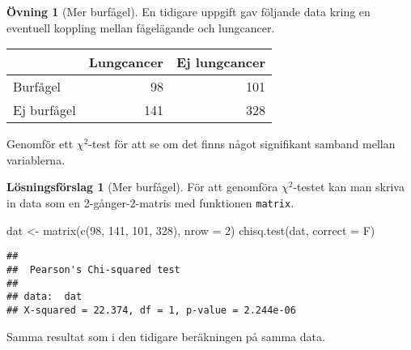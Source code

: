 \documentclass[
]{book}
\newenvironment{Shaded}{\begin{snugshade}}{\end{snugshade}}
\newcommand{\AttributeTok}[1]{\textcolor[rgb]{0.77,0.63,0.00}{#1}}
\newcommand{\DecValTok}[1]{\textcolor[rgb]{0.00,0.00,0.81}{#1}}
\newcommand{\FunctionTok}[1]{\textcolor[rgb]{0.00,0.00,0.00}{#1}}
\newcommand{\NormalTok}[1]{#1}
\newcommand{\OtherTok}[1]{\textcolor[rgb]{0.56,0.35,0.01}{#1}}
\theoremstyle{definition}
\theoremstyle{definition}
\theoremstyle{definition}
\newtheorem{exercise}{Övning}[chapter]
\theoremstyle{definition}
\newtheorem{hypothesis}{Lösningsförslag}[chapter]
\theoremstyle{remark}
\begin{document}
\begin{exercise}[Mer burfågel]
En tidigare uppgift gav följande data kring en eventuell koppling mellan fågelägande och lungcancer.

\begin{table}
\centering
\begin{tabular}[t]{lrr}
\toprule
  & Lungcancer & Ej lungcancer\\
\midrule
Burfågel & 98 & 101\\
Ej burfågel & 141 & 328\\
\bottomrule
\end{tabular}
\end{table}

Genomför ett \(\chi^2\)-test för att se om det finns något signifikant samband mellan variablerna.
\end{exercise}

\begin{hypothesis}[Mer burfågel]
För att genomföra \(\chi^2\)-testet kan man skriva in data som en 2-gånger-2-matris med funktionen \texttt{matrix}.

\begin{Shaded}
\begin{Highlighting}[]
\NormalTok{dat }\OtherTok{\textless{}{-}} \FunctionTok{matrix}\NormalTok{(}\FunctionTok{c}\NormalTok{(}\DecValTok{98}\NormalTok{, }\DecValTok{141}\NormalTok{, }\DecValTok{101}\NormalTok{, }\DecValTok{328}\NormalTok{), }\AttributeTok{nrow =} \DecValTok{2}\NormalTok{)}
\FunctionTok{chisq.test}\NormalTok{(dat, }\AttributeTok{correct =}\NormalTok{ F)}
\end{Highlighting}
\end{Shaded}

\begin{verbatim}
## 
##  Pearson's Chi-squared test
## 
## data:  dat
## X-squared = 22.374, df = 1, p-value = 2.244e-06
\end{verbatim}

Samma resultat som i den tidigare beräkningen på samma data.
\end{hypothesis}
\end{document}
